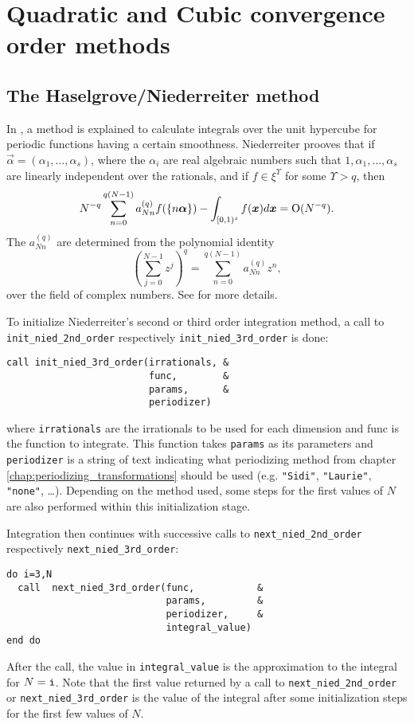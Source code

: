 \chapter{Quadratic and Cubic convergence order methods}

\section{The Haselgrove/Niederreiter method}

In \cite{niederreiter73}, a method is explained to calculate integrals over the
unit hypercube for periodic functions having a certain smoothness.  Niederreiter
prooves that
if $\vec{\alpha} = (\alpha_1, \dots, \alpha_s)$, where the $\alpha_i$ are real algebraic numbers such that $1, \alpha_1, \dots, \alpha_s$ are linearly
independent over the rationals, and if $f \in \xi^\Upsilon$ for some $\Upsilon > q$, then
\begin{equation} \label{eq:convergence_niederreiter_improved}
N^{-q}\sum_{n=0}^{q(N-1)}a_{Nn}^{(q)}f(\{n\boldsymbol{\alpha}\})
        - \int_{[0,1)^s}f(\boldsymbol{x})d\boldsymbol{x} = \operatorname{O}(N^{-q}).
\end{equation}
The $a_{Nn}^{(q)}$ are determined from the polynomial identity
\[
\left( \sum_{j=0}^{N-1}z^j \right)^q = \sum_{n=0}^{q(N-1)}a_{Nn}^{(q)}z^n,
\]
over the field of complex numbers.  See \cite{niederreiter73} for more details.

To initialize Niederreiter's second or third order integration method, a call
to \verb!init_nied_2nd_order! respectively \verb!init_nied_3rd_order! is done:
%
\begin{lstlisting}
call init_nied_3rd_order(irrationals, &
                         func,        &
                         params,      &
                         periodizer)
\end{lstlisting}
%
where \verb!irrationals! are the irrationals to be used for each dimension and
func is the function to integrate.  This function takes \verb!params! as its
parameters and \verb!periodizer! is a string of text indicating what
periodizing method from chapter \ref{chap:periodizing_transformations} should
be used (e.g. \verb!"Sidi"!, \verb!"Laurie"!, \verb!"none"!, \ldots).  Depending
on the method used, some steps for the first values of $N$ are also performed
within this initialization stage.

Integration then continues with successive calls to \verb!next_nied_2nd_order!
respectively \verb!next_nied_3rd_order!:
\begin{lstlisting}
do i=3,N
  call  next_nied_3rd_order(func,           &
                            params,         &
                            periodizer,     &
                            integral_value)
end do
\end{lstlisting}
After the call, the value in \verb!integral_value! is the approximation to the
integral for $N=\verb!i!$.  Note that the first value returned by a call to
\verb!next_nied_2nd_order! or \verb!next_nied_3rd_order! is the value of the
integral after some initialization steps for the first few values of $N$.


